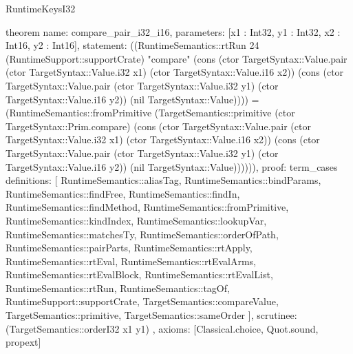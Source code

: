 \begin{lexlean}{RuntimeKeysI32}
\begin{semanticmodule}
theorem{
  name: compare_pair_i32_i16,
  parameters: [x1 : Int32, y1 : Int32, x2 : Int16, y2 : Int16],
  statement: ((RuntimeSemantics::rtRun 24 (RuntimeSupport::supportCrate) "compare" (cons (ctor TargetSyntax::Value.pair (ctor TargetSyntax::Value.i32 x1) (ctor TargetSyntax::Value.i16 x2)) (cons (ctor TargetSyntax::Value.pair (ctor TargetSyntax::Value.i32 y1) (ctor TargetSyntax::Value.i16 y2)) (nil TargetSyntax::Value)))) = (RuntimeSemantics::fromPrimitive (TargetSemantics::primitive (ctor TargetSyntax::Prim.compare) (cons (ctor TargetSyntax::Value.pair (ctor TargetSyntax::Value.i32 x1) (ctor TargetSyntax::Value.i16 x2)) (cons (ctor TargetSyntax::Value.pair (ctor TargetSyntax::Value.i32 y1) (ctor TargetSyntax::Value.i16 y2)) (nil TargetSyntax::Value)))))),
  proof: term_cases{
    definitions: [
      RuntimeSemantics::aliasTag,
      RuntimeSemantics::bindParams,
      RuntimeSemantics::findFree,
      RuntimeSemantics::findIn,
      RuntimeSemantics::findMethod,
      RuntimeSemantics::fromPrimitive,
      RuntimeSemantics::kindIndex,
      RuntimeSemantics::lookupVar,
      RuntimeSemantics::matchesTy,
      RuntimeSemantics::orderOfPath,
      RuntimeSemantics::pairParts,
      RuntimeSemantics::rtApply,
      RuntimeSemantics::rtEval,
      RuntimeSemantics::rtEvalArms,
      RuntimeSemantics::rtEvalBlock,
      RuntimeSemantics::rtEvalList,
      RuntimeSemantics::rtRun,
      RuntimeSemantics::tagOf,
      RuntimeSupport::supportCrate,
      TargetSemantics::compareValue,
      TargetSemantics::primitive,
      TargetSemantics::sameOrder
    ],
    scrutinee: (TargetSemantics::orderI32 x1 y1)
  },
  axioms: [Classical.choice, Quot.sound, propext]
}


\end{semanticmodule}
\end{lexlean}

